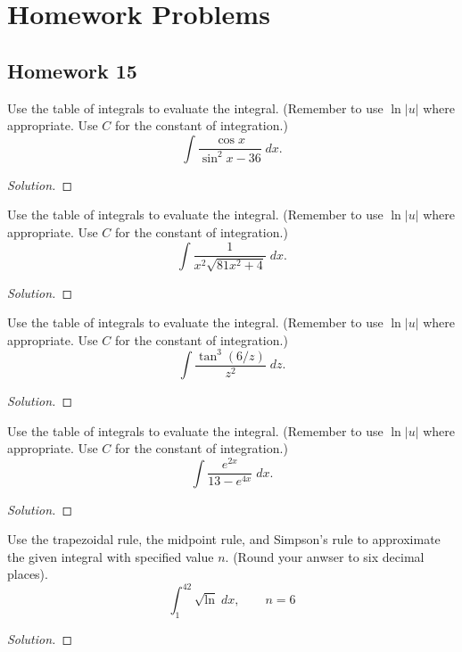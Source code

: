 \chapter{Homework Problems}
\section{Homework 15}
\begin{problem}[WebAssign, HW 15, \# 1]
Use the table of integrals to evaluate the integral. (Remember to use
$\ln|u|$ where appropriate. Use $C$ for the constant of integration.)
\[
\int\frac{\cos x}{\sin^2x-36}\;dx.
\]
\end{problem}
\begin{proof}[Solution]
\end{proof}

\begin{problem}[WebAssign, HW 15, \# 2]
Use the table of integrals to evaluate the integral. (Remember to use
$\ln|u|$ where appropriate. Use $C$ for the constant of integration.)
\[
\int\frac{1}{x^2\sqrt{81x^2+4}}\;dx.
\]
\end{problem}
\begin{proof}[Solution]
\end{proof}

\begin{problem}[WebAssign, HW 15, \# 3]
Use the table of integrals to evaluate the integral. (Remember to use
$\ln|u|$ where appropriate. Use $C$ for the constant of integration.)
\[
\int\frac{\tan^3(6/z)}{z^2}\;dz.
\]
\end{problem}
\begin{proof}[Solution]
\end{proof}

\begin{problem}[WebAssign, HW 15, \# 4]
Use the table of integrals to evaluate the integral. (Remember to use
$\ln|u|$ where appropriate. Use $C$ for the constant of integration.)
\[
\int\frac{e^{2x}}{13-e^{4x}}\;dx.
\]
\end{problem}
\begin{proof}[Solution]
\end{proof}

\begin{problem}[WebAssign, HW 15, \# 5]
Use the trapezoidal rule, the midpoint rule, and Simpson's rule to
approximate the given integral with specified value $n$. (Round your anwser
to six decimal places).
\[
\int_1^42\sqrt{\ln}\;dx,\qquad n=6
\]
\end{problem}
\begin{proof}[Solution]
\end{proof}

